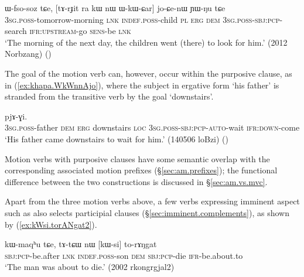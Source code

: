 \begin{exe}
	\ex \label{ex:WkWCar.loCenW}
	\gll ɯ-fso-soz tɕe, [tɤ-rɟit ra kɯ nɯ ɯ-kɯ-ɕar] jo-ɕe-nɯ ɲɯ-ŋu tɕe \\
	\textsc{3sg}.\textsc{poss}-tomorrow-morning \textsc{lnk} \textsc{indef}.\textsc{poss}-child \textsc{pl} \textsc{erg} \textsc{dem} \textsc{3sg}.\textsc{poss}-\textsc{sbj}:\textsc{pcp}-search \textsc{ifr}:\textsc{upstream}-go \textsc{sens}-be \textsc{lnk} \\
	\glt  `The morning of the next day, the children went (there) to look for him.'  (2012 Norbzang)
	()
\end{exe}

The goal of the motion verb can, however, occur within the purposive clause, as in (\ref{ex:khapa.WkWnnAjo}), where the subject in ergative form  `his father' is stranded from the transitive verb  by the goal  `downstairs'.

\begin{exe}
	\ex \label{ex:khapa.WkWnnAjo}
	 pjɤ-ɣi.  \\
	\textsc{3sg}.\textsc{poss}-father \textsc{dem} \textsc{erg} downstairs \textsc{loc}    \textsc{3sg}.\textsc{poss}-\textsc{sbj}:\textsc{pcp}-\textsc{auto}-wait \textsc{ifr}:\textsc{down}-come \\
	\glt `His father came downstairs to wait for him.' (140506 loBzi)
()
\end{exe}


Motion verbs with purposive clauses have some semantic overlap with the corresponding associated motion prefixes (§\ref{sec:am.prefixes}); the functional difference between the two constructions is discussed in §\ref{sec:am.vs.mvc}.

Apart from the three motion verbs above, a few verbs expressing imminent aspect such as  also selects participial clauses (§\ref{sec:imminent.complements}), as shown by (\ref{ex:kWsi.torANgat2}).

\begin{exe}
	\ex \label{ex:kWsi.torANgat2}
	\gll kɯ-maqʰu tɕe, tɤ-tɕɯ nɯ [kɯ-si] to-rɤŋgat \\
	\textsc{sbj}:\textsc{pcp}-be.after \textsc{lnk} \textsc{indef}.\textsc{poss}-son \textsc{dem} \textsc{sbj}:\textsc{pcp}-die \textsc{ifr}-be.about.to \\
	\glt `The man was about to die.' (2002 rkongrgjal2)
\end{exe} 

